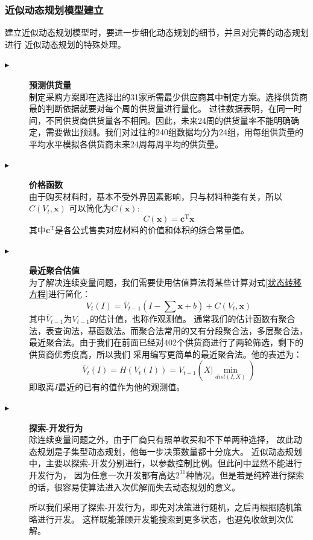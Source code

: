 \documentclass{cumcmthesis}
\begin{document}
\subsubsection*{近似动态规划模型建立}
建立近似动态规划模型时，要进一步细化动态规划的细节，并且对完善的动态规划进行
近似动态规划的特殊处理。
\begin{description}
    \item[$\blacktriangleright$] \textbf{预测供货量} \\
        制定采购方案即在选择出的31家所需最少供应商其中制定方案。选择供货商最的判断依据就要对每个周的供货量进行量化。
        过往数据表明，在同一时间，不同供货商供货量各不相同。因此，未来24周的供货量率不能明确确定，需要做出预测。我们对过往的240组数据均分为24组，用每组供货量的平均水平模拟各供货商未来24周每周平均的供货量。
    \item[$\blacktriangleright$] \textbf{价格函数} \\
        由于购买材料时，基本不受外界因素影响，只与材料种类有关，所以$C(V_t,\bm{x})$
        可以简化为$C(\bm{x})$:
        $$
            C(\bm{x}) = \bm{c}^{\text{T}}\bm{x}
        $$
        其中$\bm{c}^{\text{T}}$是各公式售卖对应材料的价值和体积的综合常量值。
    \item[$\blacktriangleright$] \textbf{最近聚合估值} \\
        为了解决连续变量问题，我们需要使用估值算法将某些计算对式\ref{状态转移方程}进行简化：
        $$
            V_t(I) = \overline{ V }_{t-1} (I - \sum \bm{x} + b) + C(V_t,\bm{x})
        $$
        其中$\overline{V}_{t-1}$为$V_{t-1}$的估计值，也称作观测值。
        通常我们的估计函数有聚合法，表查询法，基函数法。而聚合法常用的又有分段聚合法，多层聚合法，
        最近聚合法。由于我们在前面已经对402个供货商进行了两轮筛选，剩下的供货商优秀度高，所以我们
        采用编写更简单的最近聚合法。他的表述为：
        $$
            \overline{V}_t(I) = H(V_t(I)) = V_{t-1}(\left. X \right| \min_{dist(I,X)})
        $$
        即取离$I$最近的已有的值作为他的观测值。
    \item[$\blacktriangleright$] \textbf{探索-开发行为} \\
        除连续变量问题之外，由于厂商只有照单收买和不下单两种选择，
        故此动态规划是子集型动态规划，他每一步决策数量都十分庞大。
        近似动态规划中，主要以探索-开发分别进行，以参数控制比例。但此问中显然不能进行开发行为，
        因为任意一次开发都有高达$2^{31}$种情况。但是若是纯粹进行探索
        的话，很容易使算法进入次优解而失去动态规划的意义。\par
        所以我们采用了探索-开发行为，即先对决策进行随机，之后再根据随机策略进行开发。
        这样既能兼顾开发能搜索到更多状态，也避免收敛到次优解。
\end{description}
\end{document}
